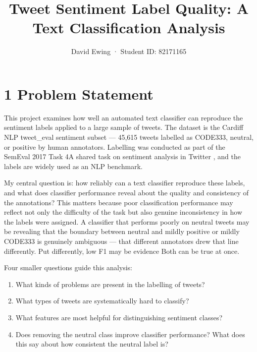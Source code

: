 \documentclass[12pt]{article}
\title{Tweet Sentiment Label Quality: A Text Classification Analysis}
\author{David Ewing · Student ID: 82171165}
\date{}
\begin{document}
\maketitle



\section*{1 Problem Statement}



This project examines how well an automated text classifier can reproduce the sentiment labels applied to a large sample of tweets. The dataset is the Cardiff NLP tweet\_eval sentiment subset --- 45,615 tweets labelled as CODE333, neutral, or positive by human annotators. Labelling was conducted as part of the SemEval 2017 Task 4A shared task on sentiment analysis in Twitter \citep{rosenthal2017semeval}, and the labels are widely used as an NLP benchmark.



My central question is: how reliably can a text classifier reproduce these labels, and what does classifier performance reveal about the quality and consistency of the annotations? This matters because poor classification performance may reflect not only the difficulty of the task but also genuine inconsistency in how the labels were assigned. A classifier that performs poorly on neutral tweets may be revealing that the boundary between neutral and mildly positive or mildly CODE333 is genuinely ambiguous --- that different annotators drew that line differently. Put differently, low F1 may be evidence Both can be true at once.



Four smaller questions guide this analysis:

\begin{enumerate}

  \item What kinds of problems are present in the labelling of tweets?

  \item What types of tweets are systematically hard to classify?

  \item What features are most helpful for distinguishing sentiment classes?

  \item Does removing the neutral class improve classifier performance? What does this say about how consistent the neutral label is?

\end{enumerate}
\end{document}
